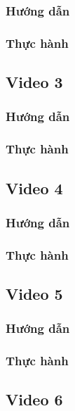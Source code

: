 \documentclass{article}
\begin{document}
\subsubsection{Hướng dẫn}

\subsubsection{Thực hành}




\subsection{Video 3}
\subsubsection{Hướng dẫn}

\subsubsection{Thực hành}




\subsection{Video 4}
\subsubsection{Hướng dẫn}

\subsubsection{Thực hành}




\subsection{Video 5}
\subsubsection{Hướng dẫn}

\subsubsection{Thực hành}




\subsection{Video 6}
\end{document}
